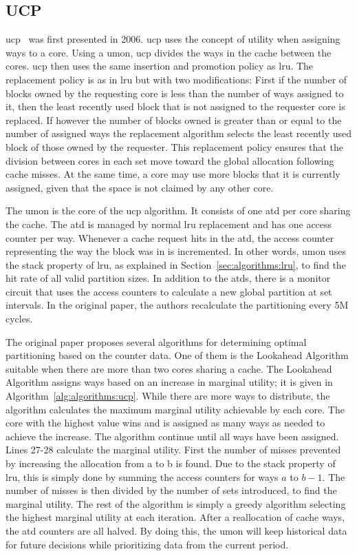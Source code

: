 \subsection{UCP}
\label{sec:algorithms:ucp}

\gls{ucp}~\cite{Qureshi2006} was first presented in 2006. 
\gls{ucp} uses the concept of utility when assigning ways to a core.
Using a \gls{umon}, \gls{ucp} divides the ways in the cache between the cores.
\gls{ucp} then uses the same insertion and promotion policy as \gls{lru}.
The replacement policy is as in \gls{lru} but with two modifications:
First if the number of blocks owned by the requesting core is less than the number of ways assigned to it, then the least recently used block that is not assigned to the requester core is replaced.
If however the number of blocks owned is greater than or equal to the number of assigned ways the replacement algorithm selects the least recently used block of those owned by the requester.
This replacement policy ensures that the division between cores in each set move toward the global allocation following cache misses.
At the same time, a core may use more blocks that it is currently assigned, given that the space is not claimed by any other core.

The \gls{umon} is the core of the \gls{ucp} algorithm.
It consists of one \gls{atd} per core sharing the cache. 
The \gls{atd} is managed by normal \gls{lru} replacement and has one access counter per way.
Whenever a cache request hits in the \gls{atd}, the access counter representing the way the block was in is incremented.
In other words, \gls{umon} uses the stack property of \gls{lru}, as explained in Section~\ref{sec:algorithms:lru}, to find the hit rate of all valid partition sizes.
In addition to the \glspl{atd}, there is a monitor circuit that uses the access counters to calculate a new global partition at set intervals.
In the original paper, the authors recalculate the partitioning every 5M cycles.

The original paper proposes several algorithms for determining optimal partitioning based on the counter data. 
One of them is the Lookahead Algorithm suitable when there are more than two cores sharing a cache.
The Lookahead Algorithm assigns ways based on an increase in marginal utility; it is given in Algorithm~\ref{alg:algorithms:ucp}.
While there are more ways to distribute, the algorithm calculates the maximum marginal utility achievable by each core. 
The core with the highest value wins and is assigned as many ways as needed to achieve the increase.
The algorithm continue until all ways have been assigned.
Lines 27-28 calculate the marginal utility. 
First the number of misses prevented by increasing the allocation from a to b is found.
Due to the stack property of \gls{lru}, this is simply done by summing the access counters for ways $a$ to $b-1$.
The number of misses is then divided by the number of sets introduced, to find the marginal utility.
The rest of the algorithm is simply a greedy algorithm selecting the highest marginal utility at each iteration.
After a reallocation of cache ways, the \gls{atd} counters are all halved.
By doing this, the \gls{umon} will keep historical data for future decisions while prioritizing data from the current period.

